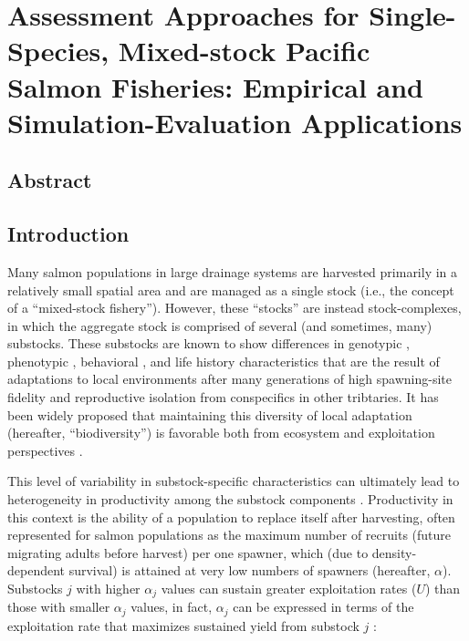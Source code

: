 \documentclass[12pt,]{book}
\theoremstyle{definition}
\theoremstyle{definition}
\theoremstyle{definition}
\theoremstyle{remark}
\begin{document}
\chapter{Assessment Approaches for Single-Species, Mixed-stock Pacific
Salmon Fisheries: Empirical and Simulation-Evaluation
Applications}\label{ch4}

\section*{Abstract}\label{abstract}

\newpage

\section{Introduction}\label{introduction}

\noindent
Many salmon populations in large drainage systems are harvested
primarily in a relatively small spatial area and are managed as a single
stock (i.e., the concept of a ``mixed-stock fishery''). However, these
``stocks'' are instead stock-complexes, in which the aggregate stock is
comprised of several (and sometimes, many) substocks. These substocks
are known to show differences in genotypic \citep{templin-etal-2004},
phenotypic \citep[\emph{e.g.}, morphology;][]{hendry-quinn-1997},
behavioral \citep[e.g., run
timing;][]{clark-etal-2015, smith-liller-2017a, smith-liller-2017b}, and
life history \citep[i.e., age-at-maturation,][]{blair-etal-1993}
characteristics that are the result of adaptations to local environments
after many generations of high spawning-site fidelity and reproductive
isolation from conspecifics in other tribtaries. It has been widely
proposed that maintaining this diversity of local adaptation (hereafter,
``biodiversity'') is favorable both from ecosystem and exploitation
perspectives \citep[\emph{i.e.}, the statistical dampening of random
variability in a system made up of many additive random processes,
otherwise known as the ``portfolio
effect'';][]{schindler-etal-2010, schindler-etal-2015}.

This level of variability in substock-specific characteristics can
ultimately lead to heterogeneity in productivity among the substock
components \citep{walters-martell-2004}. Productivity in this context is
the ability of a population to replace itself after harvesting, often
represented for salmon populations as the maximum number of recruits
(future migrating adults before harvest) per one spawner, which (due to
density-dependent survival) is attained at very low numbers of spawners
(hereafter, \(\alpha\)). Substocks \(j\) with higher \(\alpha_j\) values
can sustain greater exploitation rates (\(U\)) than those with smaller
\(\alpha_j\) values, in fact, \(\alpha_j\) can be expressed in terms of
the exploitation rate that maximizes sustained yield from substock \(j\)
\citep[\(U_{\text{MSY},j}\);][]{schnute-kronlund-2002}:
\end{document}
